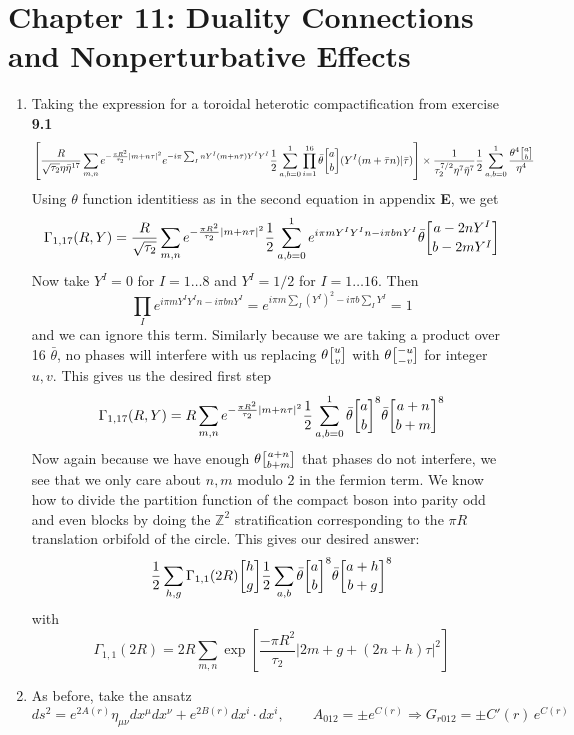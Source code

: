 \documentclass[11pt, class=article, crop=false]{standalone}
\begin{document}
\section*{Chapter 11: Duality Connections and Nonperturbative Effects} %
\label{sec:chapter_11_duality_connections_and_nonperturbative_effects}
\begin{enumerate}
	\item Taking the expression for a toroidal heterotic compactification from exercise \textbf{9.1} 
	\[
		\left[\frac{R}{\sqrt{\tau_2} \eta \bar \eta^{17}} \sum_{m,n} e^{-\frac{\pi R^2}{\tau_2} |m + n \tau|^2} e^{-i \pi \sum_I n Y^I (m + n \bar \tau) Y^I Y^I}\frac12 \sum_{a,b=0}^1  \prod_{i=1}^{16} \bar \theta \twist ab (Y^I (m + \bar \tau n) | \bar \tau) \right] \times \frac{1}{\tau_2^{7/2} \eta^7 \bar \eta^7} \frac12 \sum_{a,b = 0}^1 \frac{\theta^4 \twist a b}{\eta^4}
	\]
	Using $\theta$ function identitiess as in the second equation in appendix \textbf{E}, we get
	\[
		\Gamma_{1,17}(R, Y) = \frac{R}{\sqrt{\tau_2}} \sum_{m,n} e^{-\frac{\pi R^2}{\tau_2} |m + n \tau|^2} \frac12 \sum_{a,b=0}^1 e^{i \pi m Y^I Y^I n - i \pi b n Y^I} \bar \theta \twist{a - 2n Y^I}{b - 2m Y^I}
	\]
	Now take $Y^I = 0$ for $I = 1 \dots 8$ and $Y^I = 1/2$ for $I = 1 \dots 16$. Then
	\[
		\prod_I e^{i \pi m Y^I Y^I n - i \pi b n Y^I}  = e^{i \pi m \sum_I (Y^I)^2 - i \pi b \sum_I Y^I} = 1
	\]
	and we can ignore this term. Similarly because we are taking a product over 16 $\bar \theta$, no phases will interfere with us replacing $\theta\twist uv$ with $\theta \twist{-u}{-v}$ for integer $u, v$. This gives us the desired first step
	\[
		\Gamma_{1,17}(R, Y) = R \sum_{m,n} e^{-\frac{\pi R^2}{\tau_2} |m + n \tau|^2} \frac12 \sum_{a,b=0}^1 \bar \theta \twist ab^8 \bar \theta \twist{a+n}{b+m}^8
	\]
	Now again because we have enough $\theta \twist{a+n}{b+m}$ that phases do not interfere, we see that we only care about $n,m$ modulo $2$ in the fermion term. We know how to divide the partition function of the compact boson into parity odd and even blocks by doing the $\mathbb Z^2$ stratification corresponding to the $\pi R$ translation orbifold of the circle. This gives our desired answer:
	\[
		\frac12 \sum_{h,g} \Gamma_{1,1}(2R) \twist hg \frac12 \sum_{a,b} \bar \theta \twist ab^8 \bar \theta \twist{a+h}{b+g}^8
	\]
	with 
	\[
		\Gamma_{1,1} (2R) = 2R \sum_{m,n} \exp\left[\frac{-\pi R^2}{\tau_2} |2m + g + (2n + h)\tau|^2 \right]
	\]
	
	\item As before, take the ansatz
	\[
		ds^2 = e^{2A(r)} \eta_{\mu \nu} dx^\mu dx^\nu + e^{2B(r)} dx^i \cdot dx^i, \qquad A_{012} = \pm e^{C(r)} \Rightarrow G_{r 012} = \pm C'(r)\, e^{C(r)}
	\]
	

\end{enumerate}
\end{document}
